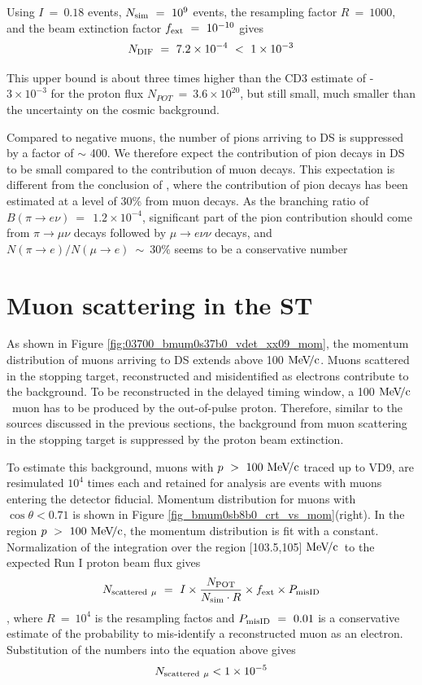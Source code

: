 \documentclass[12pt]{article}
\newcommand {\MeVc}       {\mbox{$\rm MeV\!/c$}}
\newcommand {\ra}        {\rightarrow}
\begin{document}
\noindent
Using $I ~=~ 0.18$ events, $N_{\rm sim} ~=~ 10^9$ events,
the resampling factor $R ~=~ 1000$, and the beam extinction factor $f_{\rm ext} ~=~ 10^{-10}$
gives 
$$
N_{\rm DIF} ~=~ 7.2 \times 10^{-4} ~<~ 1  \times 10^{-3}
$$
  
This upper bound is about three times higher than the CD3 estimate
of \cite{MU2E_4342_MUON_DECAYS_IN_FLIGHT_TDR} - $3\times 10^{-3}$ for the proton flux $N_{POT} ~=~ 3.6\times 10^{20}$,
but still small, much smaller than the uncertainty on the cosmic background.

Compared to negative muons, the number of pions arriving to DS is suppressed
by a factor of $\sim$ 400.
We therefore expect the contribution of pion decays in DS to be small compared
to the contribution of muon decays.
%
This expectation is different from the conclusion of \cite{MU2E_4342_MUON_DECAYS_IN_FLIGHT_TDR},
where the contribution of pion decays has been estimated at a level of 30\% from muon decays.
As the branching ratio of  $B(\pi \ra e \nu) ~=~~ 1.2 \times 10^{-4}$, 
significant part of the pion contribution should come from $\pi \ra \mu \nu$ 
decays followed by $\mu \ra e \nu\nu$ decays, and $N(\pi \ra e)/N(\mu \ra e) ~\sim~ 30\%$
seems to be a conservative number
\section {Muon scattering in the ST}

As shown in Figure \ref{fig:03700_bmum0s37b0_vdet_xx09_mom}, the momentum distribution
of muons arriving to DS extends above 100 \MeVc. 
Muons scattered in the stopping target, reconstructed and misidentified as electrons
contribute to the background. 
To be reconstructed in the delayed timing window, a 100 \MeVc\ muon has to be produced
by the out-of-pulse proton. Therefore, similar to the sources discussed in the previous
sections, the background from muon scattering in the stopping target is suppressed
by the proton beam extinction.

To estimate this background, muons with $p ~>~ 100 ~\MeVc$ traced up to VD9,
are resimulated $10^4$ times each and retained for analysis are events with muons
entering the detector fiducial. Momentum distribution for muons with $\cos\theta < 0.71$
is shown in Figure \ref{fig_bmum0sb8b0_crt_vs_mom}(right).
In the region $p ~>~ 100 ~\MeVc$, the momentum distribution is fit with a constant.
Normalization of the integration over the region [103.5,105] \MeVc\
to the expected Run I proton beam flux gives
\begin{equation}
   N_{\rm scattered~ \mu} ~=~ I \times {\frac{N_{\rm POT}}{N_{\rm sim} \cdot R}}  \times f_{\rm ext} \times P_{\rm misID}
\end{equation}
, where $R ~=~ 10^4$ is the resampling factos and $ P_{\rm misID} ~=~ 0.01$ is a conservative
estimate of the probability to mis-identify a reconstructed muon as an electron.
Substitution of the numbers into the equation above gives
$$
 N_{\rm scattered~ \mu} < 1 \times 10^{-5}
$$
\end{document}
